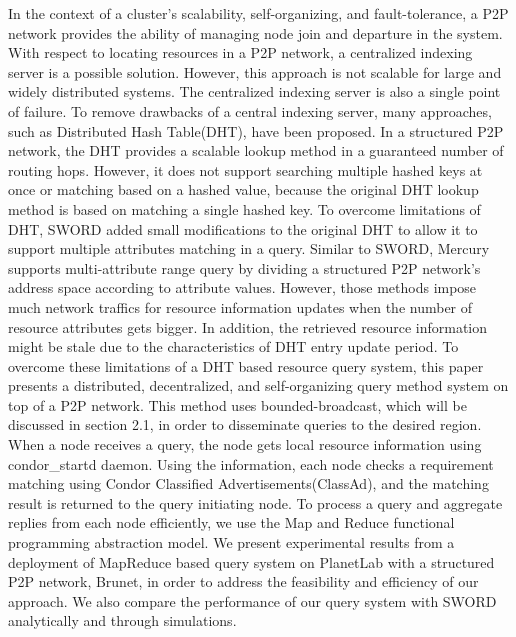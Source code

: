 \documentclass{acm_proc_article-sp}
\begin{document}
In the context of a cluster's scalability, self-organizing, and fault-tolerance, a P2P network\cite{chord}\cite{pastry}\cite{can}\cite{bamboo} provides the ability of managing node join and departure in the system. 
With respect to locating resources in a P2P network, a centralized indexing server is a possible solution\cite{bonic}\cite{condor}.
However, this approach is not scalable for large and widely distributed systems. The centralized indexing server is also a single point of failure.
To remove drawbacks of a central indexing server, many approaches, such as  Distributed Hash Table(DHT), have been proposed.
In a structured P2P network, the DHT provides a scalable lookup method in a guaranteed number of routing hops\cite{chord}\cite{pastry}. 
However, it does not support searching multiple hashed keys at once or matching based on a hashed value, because the original DHT lookup method is based on matching a single hashed key.
To overcome limitations of DHT, SWORD\cite{sword} added small modifications to the original DHT to allow it to support multiple attributes matching in a query.
Similar to SWORD, Mercury\cite{mercury} supports multi-attribute range query by dividing a structured P2P network's address space according to attribute values. 
However, those methods impose much network traffics for resource information updates when the number of resource attributes gets bigger. 
In addition, the retrieved resource information might be stale due to the characteristics of DHT entry update period.
To overcome these limitations of a DHT based resource query system, this paper presents a distributed, decentralized, and self-organizing query method system on top of a P2P network. 
This method uses bounded-broadcast, which will be discussed in section 2.1, in order to disseminate queries to the desired region.
When a node receives a query, the node gets local resource information using condor\_startd daemon\cite{condor}.
Using the information, each node checks a requirement matching using Condor Classified Advertisements(ClassAd)\cite{classad}, and the matching result is returned to the query initiating node. 
To process a query and aggregate replies from each node efficiently, we use the Map and Reduce functional programming abstraction model.
We present experimental results from a deployment of MapReduce based query system on PlanetLab\cite{planetlab} with a structured P2P network, Brunet\cite{brunet}, in order to address the feasibility and efficiency of our approach. 
We also compare the performance of our query system with SWORD\cite{sword} analytically and through simulations.
\end{document}
